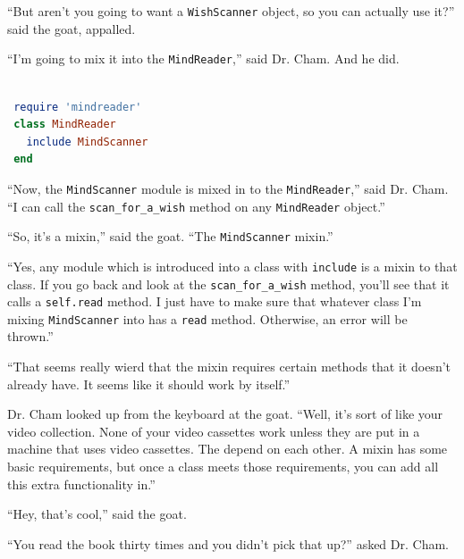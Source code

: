\documentclass[10pt,twoside]{report}
\begin{document}
``But aren't you going to want a
\lstinline[breaklines=true]|WishScanner| object, so you can actually
use it?'' said the goat, appalled.

``I'm going to mix it into the
\lstinline[breaklines=true]|MindReader|,'' said Dr. Cham.  And he did.


\begin{lstlisting}[basicstyle=\ttfamily\color{basiccolor},
    commentstyle = \ttfamily\color{commentcolor},
    keywordstyle=\ttfamily\color{keywordscolor},
    stringstyle=\color{stringcolor},
    language=Ruby,
    basicstyle=\small\ttfamily,
    showstringspaces=false,
  ]

 require 'mindreader'
 class MindReader
   include MindScanner
 end

\end{lstlisting}


``Now, the \lstinline[breaklines=true]|MindScanner| module is mixed in
to the \lstinline[breaklines=true]|MindReader|,'' said Dr. Cham. ``I
can call the \lstinline[breaklines=true]|scan_for_a_wish| method on
any \lstinline[breaklines=true]|MindReader| object.''

``So, it's a mixin,'' said the goat.  ``The
\lstinline[breaklines=true]|MindScanner| mixin.''

``Yes, any module which is introduced into a class with
\lstinline[breaklines=true]|include| is a mixin to that class.  If you
go back and look at the \lstinline[breaklines=true]|scan_for_a_wish|
method, you'll see that it calls a
\lstinline[breaklines=true]|self.read| method.  I just have to make
sure that whatever class I'm mixing
\lstinline[breaklines=true]|MindScanner| into has a
\lstinline[breaklines=true]|read| method.  Otherwise, an error will be
thrown.''

``That seems really wierd that the mixin requires certain methods that
it doesn't already have. It seems like it should work by itself.''

Dr. Cham looked up from the keyboard at the goat.  ``Well, it's sort
of like your video collection. None of your video cassettes work
unless they are put in a machine that uses video cassettes. The depend
on each other.  A mixin has some basic requirements, but once a class
meets those requirements, you can add all this extra functionality
in.''

``Hey, that's cool,'' said the goat.

``You read the book thirty times and you didn't pick that up?'' asked
Dr. Cham.
\end{document}
